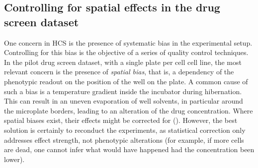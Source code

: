 \subsection{Controlling for spatial effects in the drug screen dataset}
\label{subsec:spatial_effects}
One concern in HCS is the presence of systematic bias in the experimental setup. Controlling for this bias is the objective of a series of quality control techniques. In the pilot drug screen dataset, with a single plate per cell cell line, the most relevant concern is the presence of \emph{spatial bias}, that is, a dependency of the phenotypic readout on the position of the well on the plate. A common cause of such a bias is a temperature gradient inside the incubator during hibernation. This can result in an uneven evaporation of well solvents, in particular around the microplate borders, leading to an alteration of the drug concentration. Where spatial biases exist, their effects might be corrected for (\cite{Caraus2015, Ljosa2009}). However, the best solution is certainly to reconduct the experiments, as statistical correction only addresses effect strength, not phenotypic alterations (for example, if more cells are dead, one cannot infer what would have happened had the concentration been lower).


